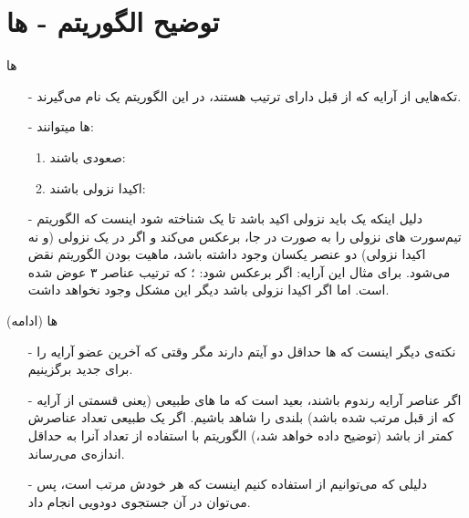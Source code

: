 \section{توضیح الگوریتم - ها}
\begin{frame}{ها}
\begin{itemize}\itemr
\item[-]
تکه‌هایی از آرایه که از قبل دارای ترتیب هستند، در این الگوریتم یک  نام می‌گیرند.
\item[-]
ها
میتوانند:
\begin{enumerate}\itemr
\item
صعودی باشند:

\item 
اکیدا نزولی باشند:
\end{enumerate}
\item[-]
دلیل اینکه یک  باید نزولی اکید باشد تا یک  شناخته شود اینست که الگوریتم تیم‌سورت ‌های نزولی را به صورت در جا، برعکس می‌کند و اگر در یک  نزولی (و نه اکیدا نزولی) دو عنصر یکسان وجود داشته باشد، ماهیت  بودن الگوریتم نقض می‌شود. برای مثال این‌ آرایه: 
اگر برعکس شود:
؛ که ترتیب عناصر ۳ عوض شده است. اما اگر اکیدا نزولی باشد دیگر این مشکل وجود نخواهد داشت.
\end{itemize}
\end{frame}

\begin{frame}{ها (ادامه)}
\begin{itemize}\itemr
\item[-]
نکته‌ی دیگر اینست که ها حداقل دو آیتم دارند مگر وقتی که آخرین عضو آرایه را برای  جدید برگزینیم.
\item[-]
اگر عناصر آرایه رندوم باشند، بعید است که ما های طبیعی (یعنی قسمتی از آرایه که از قبل مرتب شده باشد) بلندی را شاهد باشیم. اگر یک  طبیعی تعداد عناصرش کمتر از  باشد (توضیح داده خواهد شد،) الگوریتم با استفاده از  تعداد آنرا به حداقل اندازه‌ی  می‌رساند.

\item[-]
دلیلی که می‌توانیم از  استفاده کنیم اینست که هر  خودش مرتب است، پس می‌توان در آن جستجوی دودویی انجام داد.
\end{itemize}
\end{frame}


